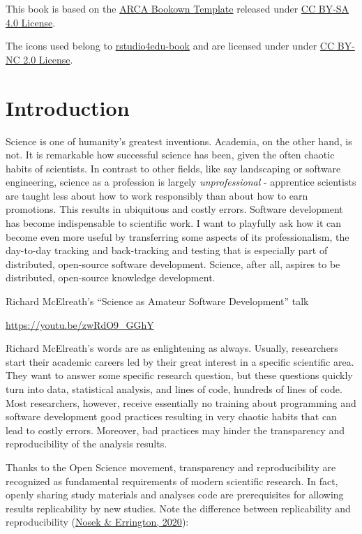 \documentclass[
  11pt,
]{book}
\renewenvironment{quote}
               {\list{}{\rightmargin\leftmargin}%
                \item\relax\begin{line-left}\setlength{\parskip}{1em}}
               {\end{line-left}\endlist}
\begin{document}
This book is based on the \href{https://github.com/arca-dpss/template-bookdown}{ARCA Bookown Template} released under \href{https://creativecommons.org/licenses/by-sa/4.0/}{CC BY-SA 4.0 License}.

The icons used belong to \href{https://rstudio4edu.github.io/rstudio4edu-book/}{rstudio4edu-book} and are licensed under under \href{https://creativecommons.org/licenses/by-nc/2.0/}{CC BY-NC 2.0 License}.

\hypertarget{introduction}{%
\chapter{Introduction}\label{introduction}}

\begin{quote}
Science is one of humanity's greatest inventions. Academia, on the other hand, is not. It is remarkable how successful science has been, given the often chaotic habits of scientists. In contrast to other fields, like say landscaping or software engineering, science as a profession is largely \emph{unprofessional} - apprentice scientists are taught less about how to work responsibly than about how to earn promotions. This results in ubiquitous and costly errors. Software development has become indispensable to scientific work. I want to playfully ask how it can become even more useful by transferring some aspects of its professionalism, the day-to-day tracking and back-tracking and testing that is especially part of distributed, open-source software development. Science, after all, aspires to be distributed, open-source knowledge development.

Richard McElreath's ``Science as Amateur Software Development'' talk

\url{https://youtu.be/zwRdO9_GGhY}
\end{quote}

Richard McElreath's words are as enlightening as always. Usually, researchers start their academic careers led by their great interest in a specific scientific area. They want to answer some specific research question, but these questions quickly turn into data, statistical analysis, and lines of code, hundreds of lines of code. Most researchers, however, receive essentially no training about programming and software development good practices resulting in very chaotic habits that can lead to costly errors. Moreover, bad practices may hinder the transparency and reproducibility of the analysis results.

Thanks to the Open Science movement, transparency and reproducibility are recognized as fundamental requirements of modern scientific research. In fact, openly sharing study materials and analyses code are prerequisites for allowing results replicability by new studies. Note the difference between replicability and reproducibility (\protect\hyperlink{ref-nosekWhatReplication2020}{Nosek \& Errington, 2020}):
\end{document}
